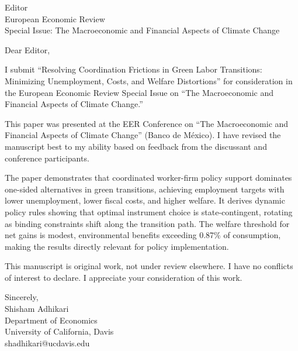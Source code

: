 \documentclass[12pt]{letter}
\begin{document}
\begin{letter}{Editor\\
European Economic Review\\
Special Issue: The Macroeconomic and Financial Aspects of Climate Change}

\opening{Dear Editor,}

I submit ``Resolving Coordination Frictions in Green Labor Transitions: Minimizing Unemployment, Costs, and Welfare Distortions'' for consideration in the European Economic Review Special Issue on ``The Macroeconomic and Financial Aspects of Climate Change.''

This paper was presented at the EER Conference on ``The Macroeconomic and Financial Aspects of Climate Change'' (Banco de México). I have revised the manuscript best to my ability based on feedback from the discussant and conference participants.

The paper demonstrates that coordinated worker-firm policy support dominates one-sided alternatives in green transitions, achieving employment targets with lower unemployment, lower fiscal costs, and higher welfare. It derives dynamic policy rules showing that optimal instrument choice is state-contingent, rotating as binding constraints shift along the transition path. The welfare threshold for net gains is modest, environmental benefits exceeding 0.87\% of consumption, making the results directly relevant for policy implementation.

This manuscript is original work, not under review elsewhere. I have no conflicts of interest to declare. I appreciate your consideration of this work.

Sincerely,\\
Shisham Adhikari\\
Department of Economics\\
University of California, Davis\\
shadhikari@ucdavis.edu
\end{letter}
\end{document}
